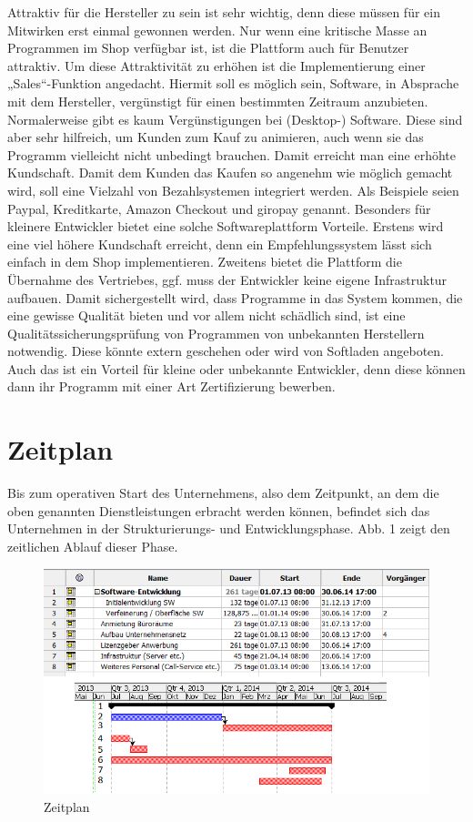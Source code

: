 Attraktiv für die Hersteller zu sein ist sehr wichtig, denn diese müssen für ein Mitwirken erst einmal gewonnen werden. 
Nur wenn eine kritische Masse an Programmen im Shop verfügbar ist, ist die Plattform auch für Benutzer attraktiv. Um diese Attraktivität zu erhöhen ist die Implementierung einer „Sales“-Funktion angedacht. Hiermit soll es möglich sein, Software, in Absprache mit dem Hersteller, vergünstigt für einen bestimmten Zeitraum anzubieten. Normalerweise gibt es kaum Vergünstigungen bei (Desktop-) Software. Diese sind aber sehr hilfreich, um Kunden zum Kauf zu animieren, auch wenn sie das Programm vielleicht nicht unbedingt brauchen. Damit erreicht man eine erhöhte Kundschaft. Damit dem Kunden das Kaufen so angenehm wie möglich gemacht wird, soll eine Vielzahl von Bezahlsystemen integriert werden. Als Beispiele seien Paypal, Kreditkarte, Amazon Checkout und giropay genannt.
Besonders für kleinere Entwickler bietet eine solche Softwareplattform Vorteile. Erstens wird eine viel höhere Kundschaft erreicht, denn ein Empfehlungssystem lässt sich einfach in dem Shop implementieren. Zweitens bietet die Plattform die Übernahme des Vertriebes, ggf. muss der Entwickler keine eigene Infrastruktur aufbauen. Damit sichergestellt wird, dass Programme in das System kommen, die eine gewisse Qualität bieten und vor allem nicht schädlich sind, ist eine Qualitätssicherungsprüfung von Programmen von unbekannten Herstellern notwendig. Diese könnte extern geschehen oder wird von Softladen angeboten. Auch das ist ein Vorteil für kleine oder unbekannte Entwickler, denn diese können dann ihr Programm mit einer Art Zertifizierung bewerben.
				
\section{Zeitplan}

Bis zum operativen Start des Unternehmens, also dem Zeitpunkt, an dem die oben genannten Dienstleistungen erbracht werden können, befindet sich das Unternehmen in der Strukturierungs- und Entwicklungsphase. Abb. 1 zeigt den zeitlichen Ablauf dieser  Phase.

\begin{figure}[h]
         \centering
                 \includegraphics[scale=1.00]{zeitplan.png}
                 \caption{Zeitplan}
         \label{fig:NM}
\end{figure}

